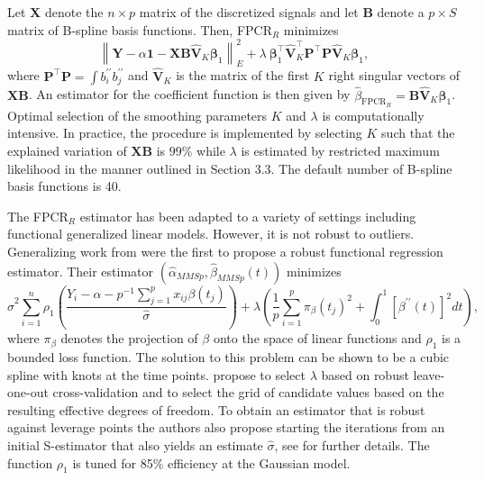 \documentclass[11pt]{article}
\begin{document}
Let $\mathbf{X}$ denote the $n \times p$ matrix of the discretized signals and let $\mathbf{B}$ denote a $p \times S$ matrix of B-spline basis functions. Then, FPCR$_R$ minimizes
\begin{equation}
\left\|\mathbf{Y}-\alpha \mathbf{1} - \mathbf{X} \mathbf{B} \widehat{\mathbf{V}}_K \boldsymbol{\beta}_1 \right\|^2_E + \lambda \ \boldsymbol{\beta}^{\top}_1 \widehat{\mathbf{V}}_K^{\top} \mathbf{P}^{\top} \mathbf{P} \widehat{\mathbf{V}}_K \boldsymbol{\beta}_1,
\end{equation}
where $\mathbf{P}^{\top}\mathbf{P} = \int b_{i}^{\prime \prime}  b_{j}^{\prime \prime} $ and $\widehat{\mathbf{V}}_K$ is the matrix of the first $K$ right singular vectors of $\mathbf{X} \mathbf{B}$. An estimator for the coefficient function is then given by $\widehat{\beta}_{\text{FPCR$_R$}} = \mathbf{B} \widehat{\boldsymbol{V}}_K \widehat{\boldsymbol{\beta}}_1$. Optimal selection of the smoothing parameters $K$ and $\lambda$ is computationally intensive. In practice, the procedure is implemented by selecting $K$ such that the explained variation of $\mathbf{X}\mathbf{B}$ is $99\%$ while $\lambda$ is estimated by restricted maximum likelihood in the manner outlined in Section 3.3. The default number of B-spline basis functions is 40.

The FPCR$_R$ estimator has been adapted to a variety of settings including functional generalized linear models. However, it is not robust to outliers. Generalizing work from \cite{crambes2009smoothing} \cite{maronna2013robust} were the first to propose a robust functional regression estimator. Their estimator $(\widehat{\alpha}_{MMSp}, \widehat{\beta}_{MMSp}(t))$ minimizes
\begin{equation}
\label{eq:40}
\widehat{\sigma}^2 \sum_{i=1}^n \rho_1 \left( \frac{Y_i - \alpha - p^{-1} \sum_{j=1}^p x_{ij} \beta(t_j)}{\widehat{\sigma}} \right) + \lambda \left(\frac{1}{p} \sum_{i=1}^p \pi_{\beta}(t_j)^2 + \int_{0}^1 \left[\beta^{\prime \prime}(t)\right]^2 dt \right),
\end{equation}
where $\pi_{\beta}$ denotes the projection of $\beta$ onto the space of linear functions and $\rho_1$ is a bounded loss function. The solution to this problem can be shown to be a cubic spline with knots at the time points. \cite{maronna2013robust} propose to select $\lambda$ based on robust leave-one-out cross-validation and to select the grid of candidate values based on the resulting effective degrees of freedom. To obtain an estimator that is robust against leverage points the authors also propose starting the iterations from an initial S-estimator that also yields an estimate $\widehat{\sigma}$, see \cite{maronna2013robust} for further details. The function $\rho_1$ is tuned for 85\% efficiency at the Gaussian model.
\end{document}
